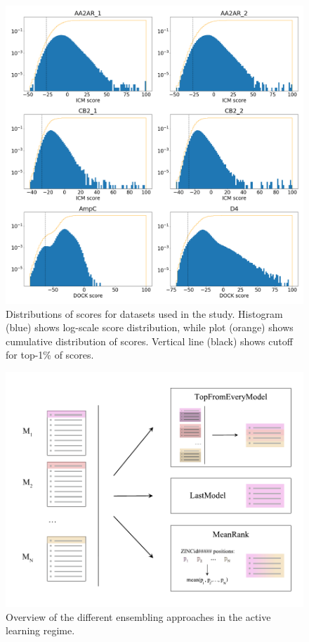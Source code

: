 \begin{figure}[ht]
\centering
\includegraphics[width=1.0\textwidth]{figures/figure_1_scores_distribution.png}
\caption{Distributions of scores for datasets used in the study. Histogram (blue) shows log-scale score distribution, while plot (orange) shows cumulative distribution of scores. Vertical line (black) shows cutoff for top-1\% of scores.}
\label{fig:fig_1_distribution}
\end{figure}


\begin{figure}[ht]
\centering
\includegraphics[width=1.0\textwidth]{figures/Figure_2_v4.pdf}
\caption{Overview of the different ensembling approaches in the active learning regime.}
\label{fig:fig_2_scheme}
\end{figure}


